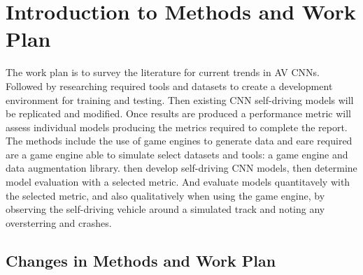 
\section{Introduction to Methods and Work Plan}


The work plan is to survey the literature for current trends in AV CNNs. Followed by researching required tools and datasets to create a development environment for training and testing. Then existing CNN self-driving models will be replicated and modified. Once results are produced a performance metric will assess individual models producing the metrics required to complete the report. 
The methods include the use of game engines to generate data and eare required are a game engine able to simulate select datasets and tools: a game engine and data augmentation library. then develop self-driving CNN models, then  determine model evaluation with a selected metric. And evaluate models quantitavely with the selected metric, and also qualitatively when using the game engine, by observing the self-driving vehicle around a simulated track and noting any oversterring and crashes.




\subsection{Changes in Methods and Work Plan}


 



